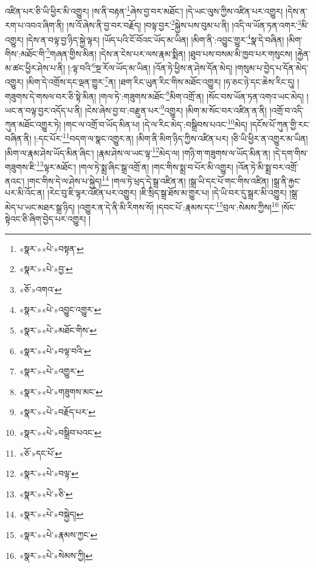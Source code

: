 འཛིན་པར་ཅི་ཡི་ཕྱིར་མི་འགྱུར། །ས་ནི་བརྟན་\footnote{«སྣར་»«པེ་»བསྟན་}ཞེས་བྱ་བར་མཐོང་། །དེ་ཡང་ལུས་ཀྱིས་འཛིན་པར་འགྱུར། །དེས་ན་རག་པ་འབའ་ཞིག་ནི། །ས་འོ་ཞེས་ནི་བྱ་བར་བརྗོད། །བལྟ་བྱར་\footnote{«སྣར་»«པེ་»བྱ་}སྐྱེས་པས་བུམ་པ་ནི། །འདི་ལ་ཡོན་ཏན་འགར་\footnote{«ཅོ་»འགའ་}མི་འགྱུར། །དེས་ན་བལྟ་བྱ་ཉིད་སྐྱེ་ལྟར། །ཡོད་པའི་ངོ་བོའང་ཡོད་མ་ཡིན། །མིག་ནི་:འབྱུང་གྱུར་\footnote{«སྣར་»«པེ་»འབྱུང་འགྱུར་}སྣ་དེ་བཞིན། །མིག་གིས་:མཐོང་གི་\footnote{«སྣར་»«པེ་»མཐོང་གིས་}གཞན་གྱིས་མིན། །དེས་ན་ངེས་པར་ལས་རྣམ་སྨིན། །ཐུབ་པས་བསམ་མི་ཁྱབ་པར་གསུངས། །རྐྱེན་མ་ཚང་ཕྱིར་ཤེས་པ་ནི། །:ལྟ་བའི་\footnote{«སྣར་»«པེ་»བལྟ་བའི་}སྔ་རོལ་ཡོད་མ་ཡིན། །འོན་ཏེ་ཕྱིས་ན་ཤེས་དོན་མེད། །གསུམ་པ་བྱེད་པ་དོན་མེད་འགྱུར། །མིག་དེ་འགྲོས་དང་ལྡན་གྱུར་\footnote{«སྣར་»«པེ་»འགྱུར་}ན། །ཐག་རིང་ཡུན་རིང་གིས་མཐོང་འགྱུར། །ཧ་ཅང་ཉེ་དང་ཆེས་རིང་དུ། །གཟུགས་དེ་གསལ་བར་ཅི་སྟེ་མིན། །གལ་ཏེ་:གཟུགས་མཐོང་\footnote{«སྣར་»«པེ་»གཟུགས་མང་}མིག་འགྲོ་ན། །སོང་བས་ཡོན་ཏན་འགའ་ཡང་མེད། །ཡང་ན་བལྟ་བྱར་འདོད་པ་ནི། །ངེས་ཞེས་བྱ་བ་:བརྫུན་པར་\footnote{«སྣར་»«པེ་»བརྗོད་པར་}འགྱུར། །མིག་མ་སོང་བར་འཛིན་ན་ནི། །འགྲོ་བ་འདི་ཀུན་མཐོང་འགྱུར་ཏེ། །གང་ལ་འགྲོ་བ་ཡོད་མིན་པ། །དེ་ལ་རིང་མེད་:བསྒྲིབས་པའང་\footnote{«སྣར་»«པེ་»བསྒྲིབ་པའང་}མེད། །དངོས་པོ་ཀུན་གྱི་རང་བཞིན་ནི། །:དང་པོར་\footnote{«ཅོ་»དང་པོ་}བདག་ལ་སྣང་འགྱུར་ན། །མིག་ནི་མིག་ཉིད་ཀྱིས་འཛིན་པར། །ཅི་ཡི་ཕྱིར་ན་འགྱུར་མ་ཡིན། །མིག་ལ་རྣམ་ཤེས་ཡོད་མིན་ཞིང་། །རྣམ་ཤེས་ལ་ཡང་ལྟ་\footnote{«སྣར་»«པེ་»བལྟ་}མེད་ལ། །གཉི་ག་གཟུགས་ལ་ཡོད་མིན་ན། །དེ་དག་གིས་གཟུགས་ཇི་\footnote{«སྣར་»«པེ་»ཅི་}ལྟར་མཐོང་། །གལ་ཏེ་སྨྲ་ཞིང་སྒྲ་འགྲོ་ན། །གང་གིས་སྨྲ་བ་པོར་མི་འགྱུར། །འོན་ཏེ་མི་སྨྲ་བར་འགྲོ་ནའང་། །གང་གིས་དེ་ལ་ཤེས་པ་སྐྱེད།\footnote{«སྣར་»«པེ་»བསྐྱེད།} །གལ་ཏེ་ཕྲད་དེ་སྒྲ་འཛིན་ན། །སྒྲ་ཡི་དང་པོ་གང་གིས་འཛིན། །སྒྲ་ནི་རྐྱང་པར་མི་འོང་ན། །རེང་བུ་ཇི་ལྟར་འཛིན་པར་འགྱུར། །ཇི་སྲིད་སྒྲ་ཐོས་མ་གྱུར་པ། །དེ་ཡི་བར་དུ་སྒྲར་མི་འགྱུར། །སྒྲ་མེད་པ་ཡང་མཐར་སྒྲ་ཉིད། །འགྱུར་ན་དེ་ནི་མི་རིགས་སོ། །དབང་པོ་:རྣམས་དང་\footnote{«སྣར་»«པེ་»རྣམས་ཀྱང་}བྲལ་:སེམས་ཀྱིས།\footnote{«སྣར་»«པེ་»སེམས་ཀྱི།} །སོང་སྟེའང་ཅི་ཞིག་བྱེད་པར་འགྱུར། །
